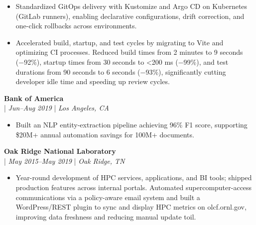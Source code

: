 \documentclass[11pt,a4paper]{article}
\newcommand{\regbullet}[1]{
    \item {\fontsize{10}{12}\selectfont #1}
}
\begin{document}
\begin{itemize}[leftmargin=18pt,itemsep=1pt,topsep=0pt]
\regbullet{Standardized GitOps delivery with Kustomize and Argo CD on Kubernetes (GitLab runners), enabling declarative configurations, drift correction, and one-click rollbacks across environments.}
\regbullet{Accelerated build, startup, and test cycles by migrating to Vite and optimizing CI processes. Reduced build times from 2 minutes to 9 seconds (−92\%), startup times from 30 seconds to <200 ms (−99\%), and test durations from 90 seconds to 6 seconds (−93\%), significantly cutting developer idle time and speeding up review cycles.}

\end{itemize}

\vspace{8pt}
\noindent\textbf{Bank of America}\\
  |  {\fontsize{10}{12}\selectfont\textit{Jun--Aug 2019}}  |  {\fontsize{10}{12}\selectfont\textit{Los Angeles, CA}}
\begin{itemize}[leftmargin=18pt,itemsep=1pt,topsep=0pt]
\regbullet{Built an NLP entity-extraction pipeline achieving 96\% F1 score, supporting \$20M+ annual automation savings for 100M+ documents.}
\end{itemize}

\vspace{8pt}
\noindent\textbf{Oak Ridge National Laboratory}\\
  |  {\fontsize{10}{12}\selectfont\textit{May 2015--May 2019}}  |  {\fontsize{10}{12}\selectfont\textit{Oak Ridge, TN}}
\begin{itemize}[leftmargin=18pt,itemsep=1pt,topsep=0pt]
\regbullet{Year-round development of HPC services, applications, and BI tools; shipped production features across internal portals. Automated supercomputer-access communications via a policy-aware email system and built a WordPress/REST plugin to sync and display HPC metrics on olcf.ornl.gov, improving data freshness and reducing manual update toil.}
\end{itemize}



\end{document}
